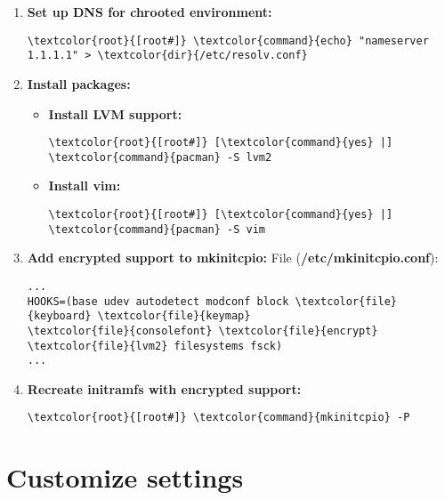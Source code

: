 \documentclass[10pt, a4paper, onecolumn, openany]{book} %
\begin{document}
\begin{enumerate}
    \item \textbf{Set up DNS for chrooted environment:}
\begin{Verbatim}[commandchars=\\\{\}]
\textcolor{root}{[root#]} \textcolor{command}{echo} "nameserver 1.1.1.1" > \textcolor{dir}{/etc/resolv.conf}
\end{Verbatim}

    \item \textbf{Install packages:}
    \begin{itemize}
        \item \textbf{Install LVM support:}
\begin{Verbatim}[commandchars=\\\{\}]
\textcolor{root}{[root#]} [\textcolor{command}{yes} |] \textcolor{command}{pacman} -S lvm2
\end{Verbatim}
        \item \textbf{Install vim:}
\begin{Verbatim}[commandchars=\\\{\}]
\textcolor{root}{[root#]} [\textcolor{command}{yes} |] \textcolor{command}{pacman} -S vim
\end{Verbatim}
    \end{itemize}

    \item \textbf{Add encrypted support to mkinitcpio:}
\newline File (\textbf{\textcolor{file}{/etc/mkinitcpio.conf}}):
\begin{Verbatim}[commandchars=\\\{\}]
...
HOOKS=(base udev autodetect modconf block \textcolor{file}{keyboard} \textcolor{file}{keymap}
\textcolor{file}{consolefont} \textcolor{file}{encrypt} \textcolor{file}{lvm2} filesystems fsck)
...
\end{Verbatim}

    \item \textbf{Recreate initramfs with encrypted support:}
\begin{Verbatim}[commandchars=\\\{\}]
\textcolor{root}{[root#]} \textcolor{command}{mkinitcpio} -P
\end{Verbatim}
\end{enumerate}
\section{Customize settings}
\end{document}
